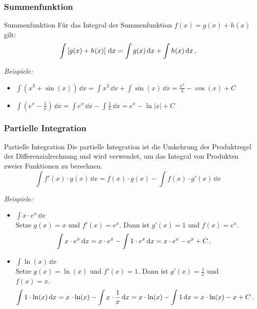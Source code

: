 \subsubsection{Summenfunktion}
\begin{rememberbox}[]{Summenfunktion}
Für das Integral der Summenfunktion $f(x) = g(x) + h(x)$ gilt:
    \begin{equation}
        \int \left[g(x) + h(x)\right]\,\mathrm{d} x = \int g(x)\,\mathrm{d} x+\int h(x) \,\mathrm{d} x \,.
    \end{equation}
\end{rememberbox}
\textit{Beispiele:}
\begin{itemize}
    \item $ \int (x^3 + \sin(x)) \,\dd x = \int x^3 \,\dd x + \int \sin(x) \,\dd x = \frac{x^4}{4} - \cos(x) + C $
    \item $ \int (e^x - \frac{1}{x}) \,\dd x = \int e^x \,\dd x - \int \frac{1}{x} \,\dd x = e^x - \ln|x| + C $
\end{itemize}

\subsubsection{Partielle Integration}
\begin{rememberbox}[]{Partielle Integration}
Die partielle Integration ist die Umkehrung der Produktregel der Differenzialrechnung und wird verwendet, um das Integral von Produkten zweier Funktionen zu berechnen.
    \begin{equation}
    \int f'(x)\cdot g(x)\,\dd x = f(x)\cdot g(x)-\int f(x)\cdot g'(x)\,\dd x
        \end{equation}
\end{rememberbox}
\textit{Beispiele:}
\begin{itemize}
    \item $\int x \cdot e^x \,\dd x$ \\
    Setze $g(x) = x$ und $f'(x) = e^x$. Dann ist $g'(x) = 1$ und $f(x) = e^x$.
    $$ \int x \cdot e^x \,\mathrm{d} x = x \cdot e^x - \int 1 \cdot e^x \,\mathrm{d} x = x \cdot e^x - e^x + C \,.$$
    \item $\int \ln(x) \,\dd x$ \\
    Setze $g(x) = \ln(x)$ und $f'(x) = 1$. Dann ist $g'(x) = \frac{1}{x}$ und $f(x) = x$.
    $$ \int 1 \cdot \ln(x) \,\mathrm{d} x = x \cdot \ln(x) - \int x \cdot \frac{1}{x} \,\mathrm{d} x = x \cdot \ln(x) - \int 1 \,\mathrm{d} x = x \cdot \ln(x) - x + C \,.$$
\end{itemize}


